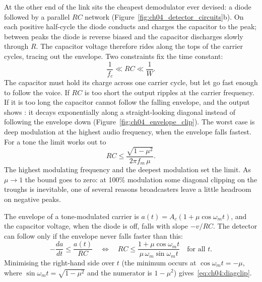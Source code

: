 At the other end of the link sits the cheapest demodulator ever devised: a diode followed by a parallel
$RC$ network (Figure~\ref{fig:ch04_detector_circuits}b). On each positive half-cycle the diode conducts
and charges the capacitor to the peak; between peaks the diode is reverse biased and the capacitor
discharges slowly through $R$. The capacitor voltage therefore rides along the tops of the carrier
cycles, tracing out the envelope. Two constraints fix the time constant:
\begin{equation}
\frac{1}{f_c}\ll RC\ll\frac{1}{W}.
\label{eq:ch04:rc}
\end{equation}
The capacitor must hold its charge across one carrier cycle, but let go fast enough to follow the
voice. If $RC$ is too short the output ripples at the carrier frequency. If it is too long the capacitor
cannot follow the falling envelope, and the output shows : it decays
exponentially along a straight-looking diagonal instead of following the envelope down
(Figure~\ref{fig:ch04_envelope_clip}). The worst case is deep modulation at the highest audio frequency,
when the envelope falls fastest. For a tone the limit works out to
\begin{equation}
RC\le\frac{\sqrt{1-\mu^2}}{2\pi f_m\,\mu}.
\label{eq:ch04:diagclip}
\end{equation}
The highest modulating frequency and the deepest modulation set the limit. As $\mu\to1$ the bound goes
to zero: at 100\% modulation some diagonal clipping on the troughs is inevitable, one of several reasons
broadcasters leave a little headroom on negative peaks.

\begin{deeper}
The envelope of a tone-modulated carrier is $a(t)=A_c(1+\mu\cos\omega_m t)$, and the capacitor voltage,
when the diode is off, falls with slope $-v/RC$. The detector can follow only if the envelope never falls
faster than this:
\begin{equation}
-\frac{da}{dt}\le\frac{a(t)}{RC}\quad\Longleftrightarrow\quad
RC\le\frac{1+\mu\cos\omega_m t}{\mu\,\omega_m\sin\omega_m t}\quad\text{for all }t.
\end{equation}
Minimising the right-hand side over $t$ (the minimum occurs at $\cos\omega_m t=-\mu$, where
$\sin\omega_m t=\sqrt{1-\mu^2}$ and the numerator is $1-\mu^2$) gives~\eqref{eq:ch04:diagclip}.
\end{deeper}


